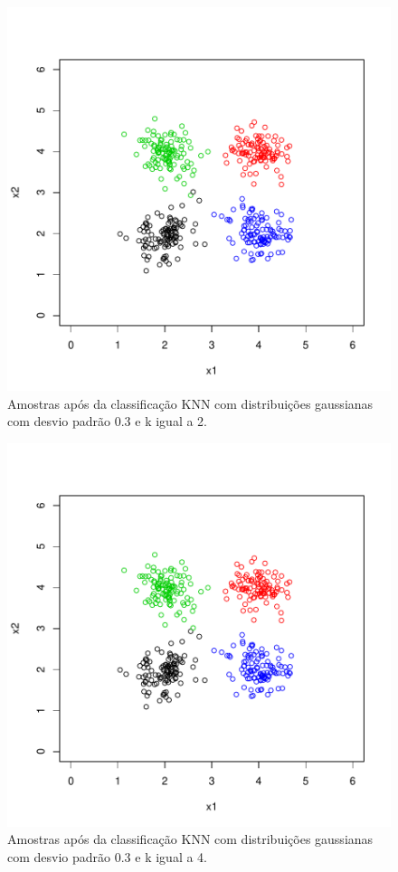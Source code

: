 \documentclass[12pt]{article}
\begin{document}
\begin{figure}[h]
\centering
\includegraphics{knn-007}
\caption{Amostras após da classificação KNN com distribuições gaussianas com desvio padrão 0.3 e k igual a 2.}
\label{sd_0.3}
\end{figure}

\begin{figure}[h]
\centering
\includegraphics{knn-008}
\caption{Amostras após da classificação KNN com distribuições gaussianas com desvio padrão 0.3 e k igual a 4.}
\label{sd_0.3}
\end{figure}
\end{document}
